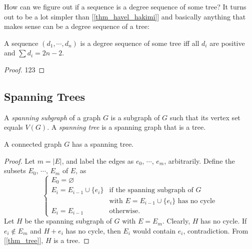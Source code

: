         How can we figure out if a sequence is a degree sequence of some tree? It turns out to be a lot simpler than [\ref{thm_havel_hakimi}] and basically anything that makes sense can be a degree sequence of a tree:
        
        \begin{thm} \label{thm_tree_degree}
            A sequence $(d_1,\cdots,d_n)$ is a degree sequence of some tree iff all $d_i$ are positive and $\sum d_i = 2n-2$.
        \end{thm}
        
        \begin{proof}
            123
        \end{proof}
    
    \subsection{Spanning Trees}
        \begin{defn} \label{def_spanning}
            A \emph{spanning subgraph} of a graph $G$ is a subgraph of $G$ such that its vertex set equals $V(G)$. A \emph{spanning tree} is a spanning graph that is a tree.
        \end{defn}
        
        \begin{thm} \label{thm_spanning_tree}
            A connected graph $G$ has a spanning tree.
        \end{thm}
        
        \begin{proof}
            Let $m = |E|$, and label the edges as $e_0$, $\cdots$, $e_m$, arbitrarily. Define the subsets $E_0$, $\cdots$, $E_m$ of $E$, as \begin{displaymath} \begin{cases}
                E_0 = \varnothing \\
                E_i = E_{i-1} \cup \{e_i\} & \text{if the spanning subgraph of $G$} \\
                & \text{with $E = E_{i-1} \cup \{e_i\}$ has no cycle} \\
                E_i = E_{i-1} & \text{otherwise.}
            \end{cases} \end{displaymath}
            Let $H$ be the spanning subgraph of $G$ with $E = E_m$. Clearly, $H$ has no cycle. If $e_i \notin E_m$ and $H+e_i$ has no cycle, then $E_i$ would contain $e_i$, contradiction. From [\ref{thm_tree}], $H$ is a tree.
        \end{proof}
        
